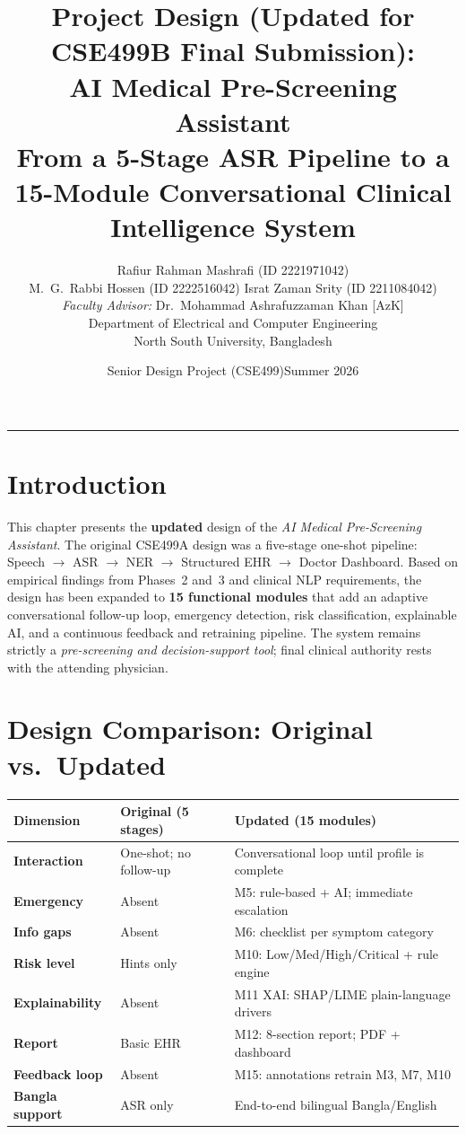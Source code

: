 \documentclass[11pt,a4paper]{article}
\title{\vspace{-20pt}
  \bfseries\large
  Project Design (Updated for CSE499B Final Submission):\\[4pt]
  AI Medical Pre-Screening Assistant\\[3pt]
  \normalfont\normalsize
  From a 5-Stage ASR Pipeline to a 15-Module Conversational
  Clinical Intelligence System}
\author{%
  Rafiur Rahman Mashrafi (ID 2221971042)\\
  M.~G.~Rabbi Hossen (ID 2222516042)\quad
  Israt Zaman Srity (ID 2211084042)\\[5pt]
  \emph{Faculty Advisor:} Dr.~Mohammad Ashrafuzzaman Khan [AzK]\\
  Department of Electrical and Computer Engineering\\
  North South University, Bangladesh}
\date{Senior Design Project (CSE499)\quad Summer 2026}
\begin{document}
\maketitle
\vspace{-6pt}\rule{\linewidth}{0.7pt}

\section{Introduction}

This chapter presents the \textbf{updated} design of the \textit{AI
Medical Pre-Screening Assistant}. The original CSE499A design was a
five-stage one-shot pipeline: Speech $\to$ ASR $\to$ NER $\to$
Structured EHR $\to$ Doctor Dashboard. Based on empirical findings
from Phases~2 and~3 and clinical NLP requirements, the design has
been expanded to \textbf{15 functional modules} that add an adaptive
conversational follow-up loop, emergency detection, risk
classification, explainable AI, and a continuous feedback and
retraining pipeline. The system remains strictly a
\textit{pre-screening and decision-support tool}; final clinical
authority rests with the attending physician.

\section{Design Comparison: Original vs.\ Updated}

{\footnotesize
\setlength{\tabcolsep}{4pt}\renewcommand{\arraystretch}{1.25}
\begin{tabularx}{\linewidth}{>{\bfseries}p{2.7cm} X X}
\toprule
Dimension & \textbf{Original (5 stages)} & \textbf{Updated (15 modules)} \\
\midrule
Interaction   & One-shot; no follow-up
              & Conversational loop until profile is complete \\
Emergency     & Absent
              & M5: rule-based + AI; immediate escalation \\
Info gaps     & Absent
              & M6: checklist per symptom category \\
Risk level    & Hints only
              & M10: Low/Med/High/Critical + rule engine \\
Explainability& Absent
              & M11 XAI: SHAP/LIME plain-language drivers \\
Report        & Basic EHR
              & M12: 8-section report; PDF + dashboard \\
Feedback loop & Absent
              & M15: annotations retrain M3, M7, M10 \\
Bangla support& ASR only
              & End-to-end bilingual Bangla/English \\
\bottomrule
\end{tabularx}}
\end{document}
